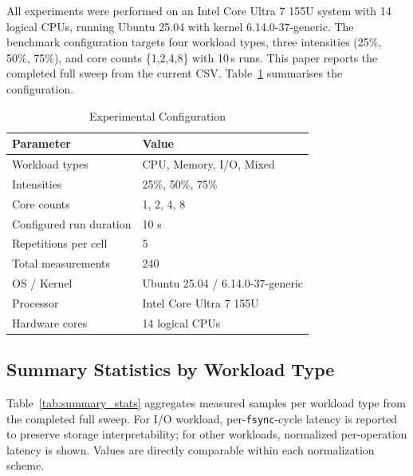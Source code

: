 \documentclass[conference]{IEEEtran}
\begin{document}
All experiments were performed on an Intel Core Ultra 7 155U system with
14 logical CPUs, running Ubuntu 25.04 with kernel 6.14.0-37-generic.  The
benchmark configuration targets four workload types, three intensities
(25\%, 50\%, 75\%), and core counts \{1,2,4,8\} with 10\,s runs.
This paper reports the completed full sweep from the current CSV.
Table~\ref{tab:setup} summarises the configuration.

\begin{table}[htbp]
\caption{Experimental Configuration}
\label{tab:setup}
\begin{center}
\begin{tabular}{ll}
\toprule
\textbf{Parameter} & \textbf{Value} \\
\midrule
Workload types     & CPU, Memory, I/O, Mixed \\
Intensities        & 25\%, 50\%, 75\% \\
Core counts        & 1, 2, 4, 8 \\
Configured run duration & 10 s \\
Repetitions per cell & 5 \\
Total measurements & 240 \\
OS / Kernel        & Ubuntu 25.04 / 6.14.0-37-generic \\
Processor          & Intel Core Ultra 7 155U \\
Hardware cores     & 14 logical CPUs \\
\bottomrule
\end{tabular}
\end{center}
\end{table}

\subsection{Summary Statistics by Workload Type}
\label{subsec:summary_stats}

Table~\ref{tab:summary_stats} aggregates measured samples per workload type
from the completed full sweep.  For I/O workload, per-\texttt{fsync}-cycle
latency is reported to preserve storage interpretability; for other workloads,
normalized per-operation latency is shown.  Values are directly comparable
within each normalization scheme.
\end{document}
